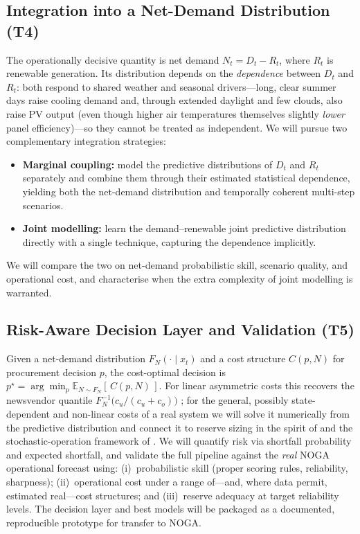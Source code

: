 \documentclass[12pt,a4paper]{article}
\begin{document}
\subsection{Integration into a Net-Demand Distribution (T4)}
\label{sec:integration}

The operationally decisive quantity is net demand $N_t = D_t - R_t$, where $R_t$ is
renewable generation. Its distribution depends on the \emph{dependence} between $D_t$ and
$R_t$: both respond to shared weather and seasonal drivers---long, clear summer days raise
cooling demand and, through extended daylight and few clouds, also raise PV output (even
though higher air temperatures themselves slightly \emph{lower} panel efficiency)---so they
cannot be treated as independent. We will pursue two complementary integration strategies:
\begin{itemize}[leftmargin=1.4em]
    \item \textbf{Marginal coupling:} model the predictive distributions of $D_t$ and
        $R_t$ separately and combine them through their estimated statistical dependence,
        yielding both the net-demand distribution and temporally coherent multi-step
        scenarios.
    \item \textbf{Joint modelling:} learn the demand--renewable joint predictive
        distribution directly with a single technique, capturing the dependence implicitly.
\end{itemize}
We will compare the two on net-demand probabilistic skill, scenario quality, and
operational cost, and characterise when the extra complexity of joint modelling is
warranted.

\subsection{Risk-Aware Decision Layer and Validation (T5)}
\label{sec:decision}

Given a net-demand distribution $F_{N}(\cdot\mid x_t)$ and a cost structure $C(p,N)$ for
procurement decision $p$, the cost-optimal decision is
$p^\star = \arg\min_p \mathbb{E}_{N\sim F_N}[\,C(p,N)\,]$. For linear asymmetric costs this
recovers the newsvendor quantile $F_N^{-1}\!\big(c_u/(c_u+c_o)\big)$
\parencite{arrow1951optimal}; for the general, possibly state-dependent and non-linear
costs of a real system we will solve it numerically from the predictive distribution and
connect it to reserve sizing in the spirit of \textcite{matos2011reserve} and the
stochastic-operation framework of \textcite{morales2014integrating}. We will quantify
risk via shortfall probability and expected shortfall, and validate the full
pipeline against the \emph{real} NOGA operational forecast using:
(i)~probabilistic skill (proper scoring rules, reliability, sharpness);
(ii)~operational cost under a range of---and, where data permit, estimated real---cost
structures; and
(iii)~reserve adequacy at target reliability levels.
The decision layer and best models will be packaged as a documented, reproducible
prototype for transfer to NOGA.
\end{document}
